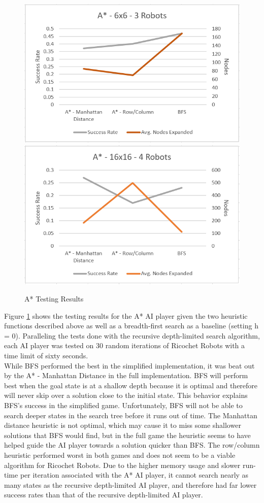 \documentclass[a4paper,10pt]{article}
\begin{document}
  \begin{figure}[h!]
    \centering
    \includegraphics[width=0.45\linewidth]{figures/img3.PNG}
    \includegraphics[width=0.45\linewidth]{figures/img4.PNG}
    \caption{A* Testing Results}
    \label{fig:A*_chart}
  \end{figure}

  Figure \ref{fig:A*_chart} shows the testing results for the A* AI player given the two heuristic functions described above as well as a breadth-first search as a
  baseline (setting h = 0).  Paralleling the tests done with the recursive depth-limited search algorithm, each AI player was tested on 30 random iterations of Ricochet
  Robots with a time limit of sixty seconds. \\

  While BFS performed the best in the simplified implementation, it was beat out by the A* - Manhattan Distance in the full implementation.  BFS will perform best when
  the goal state is at a shallow depth because it is optimal and therefore will never skip over a solution close to the initial state.  This behavior explains BFS's
  success in the simplified game.  Unfortunately, BFS will not be able to search deeper states in the search tree before it runs out of time.  The Manhattan distance
  heuristic is not optimal, which may cause it to miss some shallower solutions that BFS would find, but in the full game the heuristic seems to have helped guide the AI
  player towards a solution quicker than BFS.  The row/column heuristic performed worst in both games and does not seem to be a viable algorithm for Ricochet Robots.
  Due to the higher memory usage and slower run-time per iteration associated with the A* AI player, it cannot search nearly as many states as the recursive depth-limited
  AI player, and therefore had far lower success rates than that of the recursive depth-limited AI player.
\end{document}
